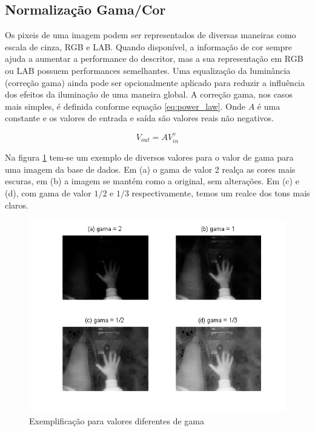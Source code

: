 \subsection{Normalização Gama/Cor}

Os pixeis de uma imagem podem ser representados de diversas maneiras como escala de cinza, RGB e LAB. Quando disponível, a informação de cor sempre ajuda a aumentar a performance do descritor, mas a sua representação em RGB ou LAB possuem performances semelhantes.
Uma equalização da luminância (correção gama) ainda pode ser opcionalmente aplicado para reduzir a influência dos efeitos da iluminação de uma maneira global. A correção gama, nos casos mais simples, é definida conforme equação \ref{eq:power_law}. Onde \(A\) é uma constante e os valores de entrada e saída são valores reais não negativos. \cite{dalal2005histograms}

\begin{equation}
V_{out} = AV_{in}^\gamma
\label{eq:power_law}
\end{equation}

Na figura \ref{fig:gamma_correction} tem-se um exemplo de diversos valores para o valor de gama para uma imagem da base de dados. Em (a) o gama de valor 2 realça as cores mais escuras, em (b) a imagem se mantém como a original, sem alterações. Em (c) e (d), com gama de valor \(1/2\) e \(1/3\) respectivamente, temos um realce dos tons mais claros.

\begin{figure}[ht!]
\centering
  \includegraphics[scale=0.8]{image/gamma_correction.png}
  \caption{Exemplificação para valores diferentes de gama}
  \label{fig:gamma_correction}
\end{figure}

